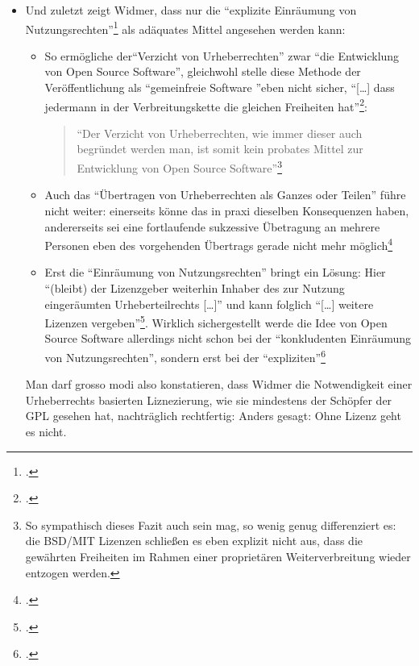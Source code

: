 \documentclass[DIV=calc,BCOR=5mm,11pt,headings=small,oneside,abstract=true, toc=bib]{scrartcl}
\begin{document}
\begin{itemize}
  \item Und zuletzt zeigt Widmer, dass nur die \enquote{explizite
  Einräumung von Nutzungsrechten}\footcite[vgl.][100]{Widmer2003a} als
  adäquates Mittel angesehen werden kann:
  \begin{itemize}
    \item So ermögliche der\enquote{Verzicht von Urheberrechten} zwar
    \enquote{die Entwicklung von Open Source Software}, gleichwohl stelle
    diese Methode der Veröffentlichung als \enquote{gemeinfreie Software
    }eben nicht sicher, \enquote{[\ldots] dass jedermann in der
    Verbreitungskette die gleichen Freiheiten
    hat}\footcite[vgl.][98]{Widmer2003a}: 
    \begin{quote} \enquote{Der
    Verzicht von Urheberrechten, wie immer dieser auch begründet werden man, ist
    somit kein probates Mittel zur Entwicklung von Open Source
    Software}\footnote{\cite[][98f]{Widmer2003a} So sympathisch dieses
    Fazit auch sein mag, so wenig genug differenziert es: die BSD/MIT Lizenzen
    schließen es eben explizit nicht aus, dass die gewährten Freiheiten im
    Rahmen einer proprietären Weiterverbreitung wieder entzogen werden.}
    \end{quote}
    \item Auch das \enquote{Übertragen von Urheberrechten als Ganzes oder
    Teilen} führe nicht weiter: einerseits könne das in praxi dieselben
    Konsequenzen haben, andererseits sei eine fortlaufende sukzessive Übetragung
    an mehrere Personen eben des vorgehenden Übertrags gerade nicht mehr
    möglich\footcite[vgl.][99]{Widmer2003a}
    \item Erst die \enquote{Einräumung von Nutzungsrechten} bringt ein
    Lösung: Hier \enquote{(bleibt) der Lizenzgeber weiterhin Inhaber des
    zur Nutzung eingeräumten Urheberteilrechts [\ldots]} und kann folglich
    \enquote{[\ldots] weitere Lizenzen
    vergeben}\footcite[vgl.][99f]{Widmer2003a}. Wirklich sichergestellt
    werde die Idee von Open Source Software allerdings nicht schon bei der
    \enquote{konkludenten Einräumung von Nutzungsrechten}, sondern erst bei
    der \enquote{expliziten}\footcite[vgl.][100]{Widmer2003a}
\end{itemize}
   
Man darf grosso modi also konstatieren, dass Widmer die Notwendigkeit einer
Urheberrechts basierten Liznezierung, wie sie mindestens der Schöpfer der GPL
gesehen hat, nachträglich rechtfertig: Anders gesagt: Ohne  Lizenz geht es nicht.
\end{itemize}
\end{document}

